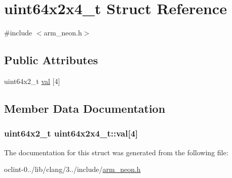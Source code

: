 \hypertarget{structuint64x2x4__t}{\section{uint64x2x4\-\_\-t Struct Reference}
\label{structuint64x2x4__t}
}


{\ttfamily \#include $<$arm\-\_\-neon.\-h$>$}

\subsection*{Public Attributes}
\begin{DoxyCompactItemize}
\item 
uint64x2\-\_\-t \hyperlink{structuint64x2x4__t_a6d4af1f655a9f35a340b0eb46f787812}{val} \mbox{[}4\mbox{]}
\end{DoxyCompactItemize}


\subsection{Member Data Documentation}
\hypertarget{structuint64x2x4__t_a6d4af1f655a9f35a340b0eb46f787812}{
\subsubsection[{val}]{\setlength{\rightskip}{0pt plus 5cm}uint64x2\-\_\-t uint64x2x4\-\_\-t\-::val\mbox{[}4\mbox{]}}}\label{structuint64x2x4__t_a6d4af1f655a9f35a340b0eb46f787812}


The documentation for this struct was generated from the following file\-:\begin{DoxyCompactItemize}
\item 
oclint-\/0../lib/clang/3../include/\hyperlink{arm__neon_8h}{arm\-\_\-neon.\-h}\end{DoxyCompactItemize}
